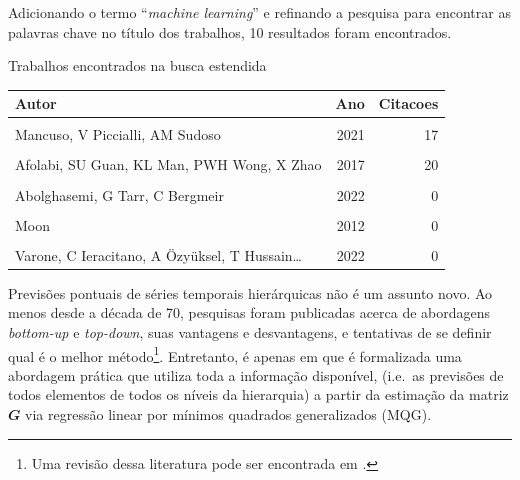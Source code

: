 \documentclass[
  12pt,
  oneside,
  a4paper,
  chapter=TITLE,
  section=TITLE,
  brazil]{abntex2}
\begin{document}
Adicionando o termo ``\emph{machine learning}'' e refinando a pesquisa
para encontrar as palavras chave no título dos trabalhos, 10 resultados
foram encontrados.

\begin{quadro}
\caption{Trabalhos encontrados na busca estendida}\tabularnewline

\centering\begingroup\fontsize{10}{12}\selectfont

\begin{tabular}[t]{lrr}
\toprule
Autor & Ano & Citacoes\\
\midrule
\cellcolor{gray!6}{Li, SMM Rahman, R Vega, B Dong} & \cellcolor{gray!6}{2016} & \cellcolor{gray!6}{114}\\
Mancuso, V Piccialli, AM Sudoso & 2021 & 17\\
\cellcolor{gray!6}{Abolghasemi, RJ Hyndman, G Tarr} & \cellcolor{gray!6}{2019} & \cellcolor{gray!6}{13}\\
Afolabi, SU Guan, KL Man, PWH Wong, X Zhao & 2017 & 20\\
\cellcolor{gray!6}{Saatloo, A Moradzadeh, H Moayyed} & \cellcolor{gray!6}{2021} & \cellcolor{gray!6}{6}\\
\addlinespace
Abolghasemi, G Tarr, C Bergmeir & 2022 & 0\\
\cellcolor{gray!6}{C Neto, BL Fernando…} & \cellcolor{gray!6}{2022} & \cellcolor{gray!6}{0}\\
Moon & 2012 & 0\\
\cellcolor{gray!6}{YAN, C SHENG} & \cellcolor{gray!6}{2018} & \cellcolor{gray!6}{1}\\
Varone, C Ieracitano, A Özyüksel, T Hussain… & 2022 & 0\\
\bottomrule
\end{tabular}
\endgroup{}
\end{quadro}

Previsões pontuais de séries temporais hierárquicas não é um assunto
novo. Ao menos desde a década de 70, pesquisas foram publicadas acerca
de abordagens \emph{bottom-up} e \emph{top-down}, suas vantagens e
desvantagens, e tentativas de se definir qual é o melhor
método\footnote{Uma revisão dessa literatura pode ser encontrada em
  \textcite{athanasopoulos_hierarchical_2009}.}. Entretanto, é apenas em
\textcite{hyndman_optimal_2011} que é formalizada uma abordagem prática
que utiliza toda a informação disponível, (i.e.~as previsões de todos
elementos de todos os níveis da hierarquia) a partir da estimação da
matriz \(\mathbfit{G}\) via regressão linear por mínimos quadrados
generalizados (MQG).
\end{document}
